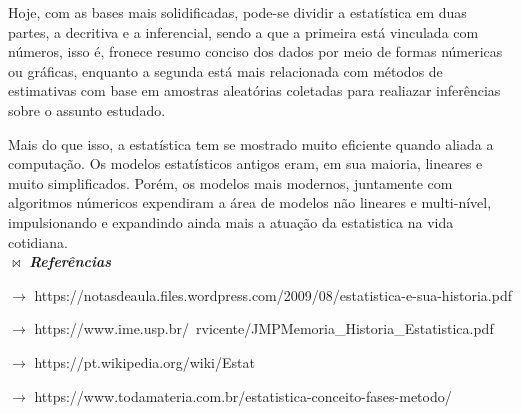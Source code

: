 \documentclass[a4paper,12pt]{article}
\begin{document}
 Hoje, com as bases mais solidificadas, pode-se dividir a estatística em duas partes, a decritiva e a inferencial, sendo a que a primeira está vinculada com números, isso é, fronece resumo conciso dos dados por meio de formas númericas ou gráficas, enquanto a segunda está mais relacionada com métodos de estimativas  com base em amostras aleatórias coletadas para realiazar inferências sobre o assunto estudado.
 
 Mais do que isso, a estatística tem se mostrado muito eficiente quando aliada a computação. Os modelos estatísticos antigos eram, em sua maioria, lineares e muito simplificados. Porém, os modelos mais modernos, juntamente com algoritmos númericos expendiram a área de modelos não lineares e multi-nível, impulsionando e expandindo ainda mais a atuação da estatistica na vida cotidiana.\\
 
 $\bowtie$ \textbf{\textit{Referências}}
 
 $\longrightarrow$ https://notasdeaula.files.wordpress.com/2009/08/estatistica-e-sua-historia.pdf
 
 $\longrightarrow$ 
 https://www.ime.usp.br/~rvicente/JMPMemoria_Historia_Estatistica.pdf
 
 $\longrightarrow$ 
 https://pt.wikipedia.org/wiki/Estat%
 
 $\longrightarrow$ 
 https://www.todamateria.com.br/estatistica-conceito-fases-metodo/
\end{document}
